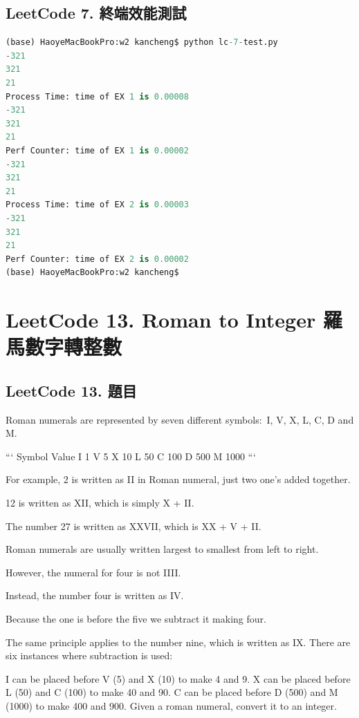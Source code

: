 \documentclass[10pt,UTF8]{ctexart}
\begin{document}
\subsection{LeetCode 7. 終端效能測試}

\begin{lstlisting}[language={python}]
(base) HaoyeMacBookPro:w2 kancheng$ python lc-7-test.py 
-321
321
21
Process Time: time of EX 1 is 0.00008
-321
321
21
Perf Counter: time of EX 1 is 0.00002
-321
321
21
Process Time: time of EX 2 is 0.00003
-321
321
21
Perf Counter: time of EX 2 is 0.00002
(base) HaoyeMacBookPro:w2 kancheng$ 
\end{lstlisting}

\newpage

\section{LeetCode 13. Roman to Integer 羅馬數字轉整數}

\subsection{LeetCode 13. 題目}

Roman numerals are represented by seven different symbols: I, V, X, L, C, D and M.

```
Symbol       Value
I             1
V             5
X             10
L             50
C             100
D             500
M             1000
```

For example, 2 is written as II in Roman numeral, just two one's added together. 

12 is written as XII, which is simply X + II. 

The number 27 is written as XXVII, which is XX + V + II.

Roman numerals are usually written largest to smallest from left to right. 

However, the numeral for four is not IIII. 

Instead, the number four is written as IV. 

Because the one is before the five we subtract it making four. 

The same principle applies to the number nine, which is written as IX. There are six instances where subtraction is used:

I can be placed before V (5) and X (10) to make 4 and 9.
X can be placed before L (50) and C (100) to make 40 and 90.
C can be placed before D (500) and M (1000) to make 400 and 900.
Given a roman numeral, convert it to an integer.
\end{document}
